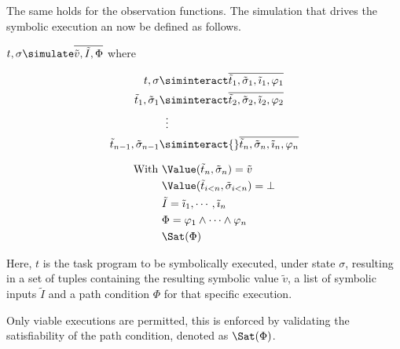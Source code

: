 The same holds for the observation functions.
The simulation that drives the symbolic execution an now be defined as follows.


\begin{definition}[Simulation]
  $t,\sigma\simulate \overline{\tilde{v},\tilde{I},\Phi}$ where

  \begin{minipage}[c]{0.4\textwidth}
    \begin{align*}
      t,\sigma             & \siminteract  \overline{\tilde{t}_1,\tilde{\sigma}_1,\tilde{\imath}_1,\phi_1}\\
      \tilde{t}_1,\tilde{\sigma}_1         & \siminteract  \overline{\tilde{t}_2,\tilde{\sigma}_2,\tilde{\imath}_2,\phi_2}\\
                           & \hspace{2mm}\vdots    \\
      \tilde{t}_{n-1},\tilde{\sigma}_{n-1} & \siminteract{}  \overline{\tilde{t}_n,\tilde{\sigma}_n,\tilde{\imath}_n,\phi_n}
    \end{align*}
\end{minipage}
\begin{minipage}[c]{0.1\textwidth}
  \Quad
\end{minipage}
\begin{minipage}[c]{0.3\textwidth}
  \begin{align*}
    \text{With }& \Value(\tilde{t}_n,\tilde{\sigma}_n)=\tilde{v}\\
    &\Value(\tilde{t}_{i<n},\tilde{\sigma}_{i<n})=\bot\\
    &\tilde{I}=\tilde{\imath}_1,\cdots,\tilde{\imath}_n\\
    &\Phi = \phi_1\land\cdots\land\phi_n\\
    &\Sat(\Phi)
  \end{align*}
\end{minipage}
\end{definition}

Here, $t$ is the task program to be symbolically executed, under state $\sigma$,
resulting in a set of tuples containing the resulting symbolic value $\tilde{v}$, a list of symbolic inputs $\tilde{I}$ and a path condition $\Phi$ for that specific execution.

Only viable executions are permitted, this is enforced by validating the satisfiability of the path condition, denoted as $\Sat(\Phi)$.

